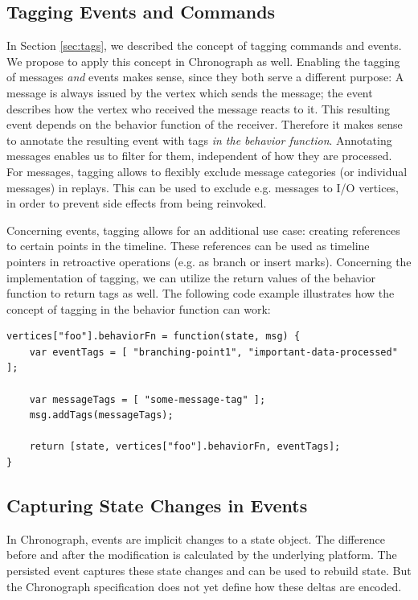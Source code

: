 \subsection{Tagging Events and Commands}
In Section \ref{sec:tags}, we described the concept of tagging commands and 
events. We propose to apply this concept in Chronograph as well.
Enabling the tagging of messages \emph{and} events makes sense, since they
both serve a different purpose: 
A message is always issued by the vertex which sends the message; the event 
describes how the vertex who received the message reacts to it. This resulting 
event depends on the behavior function of the receiver. Therefore it makes sense 
to annotate the resulting event with tags \emph{in the behavior function}.
Annotating messages enables us to filter for them, independent of how they
are processed. 
%
For messages, tagging allows to flexibly exclude message categories (or 
individual messages) in replays. This can be used to exclude e.g. messages to 
I/O vertices, in order to prevent side effects from being reinvoked.

Concerning events, tagging allows for an additional use case: creating 
references to certain points in the timeline. These references can be used as 
timeline pointers in retroactive operations (e.g. as branch or insert marks).
Concerning the implementation of tagging, we can utilize the return values
of the behavior function to return tags as well. The following code example 
illustrates how the concept of tagging in the behavior function can work:

\begin{lstlisting}[style=styled]
vertices["foo"].behaviorFn = function(state, msg) {
	var eventTags = [ "branching-point1", "important-data-processed" ];

	var messageTags = [ "some-message-tag" ];
	msg.addTags(messageTags);

	return [state, vertices["foo"].behaviorFn, eventTags];
}
\end{lstlisting}

\subsection{Capturing State Changes in Events}
\label{sec:chronograph-capturing}
In Chronograph, events are implicit changes to a state object. The difference 
before and after the modification is calculated by the underlying platform. 
The persisted event captures these state changes and can be used to rebuild 
state. But the Chronograph specification does not yet define how these deltas 
are encoded.

